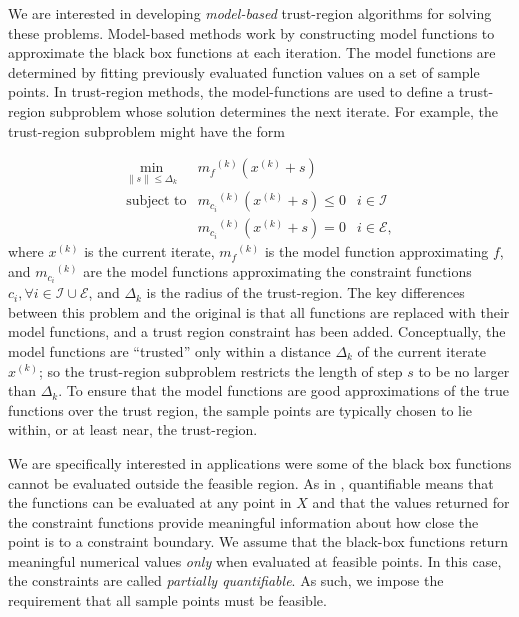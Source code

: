 \documentclass{article}
\theoremstyle{case}
\newcommand{\norm}[1]{\| #1 \|}
\newcommand{\union}{\cup}
\newcommand{\modelk}{{{m}_f}^{(k)}}
\newcommand{\modelconstrainti}{{{m}_{c_i}}^{(k)}}
\newcommand{\iteratek}{{x}^{(k)}}
\begin{document}


We are interested in developing {\em model-based} trust-region algorithms for solving these problems.
Model-based methods work by constructing model functions to approximate the black box functions at each iteration.
The model functions are determined by fitting previously evaluated function values on a set of sample points.
In trust-region methods, the model-functions are used to define a trust-region subproblem whose solution determines the next iterate.
For example, the trust-region subproblem might have the form

\[ \begin{array}{ccl} \min_{\norm{s} \le \Delta_k}
 & \modelk (\iteratek+s) \\
\mbox{subject to} & \modelconstrainti(\iteratek + s) \le 0 & i \in \mathcal{I} \\
& \modelconstrainti(\iteratek + s) = 0 & i \in \mathcal{E},
\end{array}
\]
where $\iteratek$ is the current iterate, $\modelk$ is the model function approximating $f$,  and $\modelconstrainti$ are the model functions approximating the constraint functions $c_i, \forall i \in \mathcal{I} \union \mathcal{E}$, and $\Delta_k$ is the radius of the trust-region.
The key differences between this problem and the original is that all functions are replaced with their model functions, and a trust region constraint has been added.
Conceptually, the model functions are ``trusted'' only within a distance $\Delta_k$ of the current iterate $\iteratek$; so the trust-region subproblem restricts the length of step $s$ to be no larger than $\Delta_k$.
To ensure that the model functions are good approximations of the true functions over the trust region, the sample points are typically chosen to lie within, or at least near, the trust-region.


We are specifically interested in applications were some of the black box functions cannot be evaluated outside the feasible region.
As in \cite{DUMMY:typesofconstraints}, quantifiable means that the functions can be evaluated at any point in $X$ and that the values returned for the constraint functions provide meaningful information about how close the point is to a constraint boundary.
We assume that the black-box functions return meaningful numerical values \emph{only} when evaluated at feasible points.
In this case, the constraints are called {\em partially quantifiable}.   
As such, we impose the requirement that all sample points must be feasible.
\end{document}
